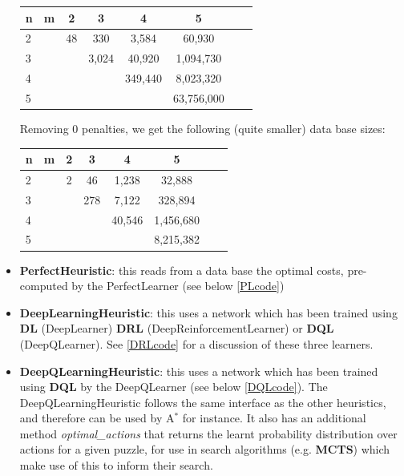 \begin{itemize}
\begin{center}
\begin{tabular}{l*{6}{c}r}
n              & m & 2 & 3 & 4 & 5\\
\hline
2              &   & 48 & 330 & 3,584 & 60,930 \\
3              &   &   & 3,024  & 40,920 &  1,094,730  \\
4              &   &   &  & 349,440 & 8,023,320   \\
5              &   &   &  &  & 63,756,000   \\
\end{tabular}
\end{center}
Removing 0 penalties, we get the following (quite smaller) data base sizes:
\begin{center}
\begin{tabular}{l*{6}{c}r}
n              & m & 2 & 3 & 4 & 5\\
\hline
2              &   & 2 & 46 & 1,238  & 32,888 \\
3              &   &  & 278  & 7,122 & 328,894   \\
4              &   &   &  & 40,546 &  1,456,680 \\
5              &   &   &  &  &  8,215,382 \\
\end{tabular}
\end{center}



\item \textbf{PerfectHeuristic}: this reads from a data base the optimal costs, pre-computed by the PerfectLearner (see below \ref{PLcode})
\item \textbf{DeepLearningHeuristic}: this uses a network which has been trained using \textbf{DL} (DeepLearner) \textbf{DRL} (DeepReinforcementLearner) or \textbf{DQL} (DeepQLearner). See \ref{DRLcode} for a discussion of these three learners.
\item \textbf{DeepQLearningHeuristic}: this uses a network which has been trained using \textbf{DQL} by the DeepQLearner (see below \ref{DQLcode}). The DeepQLearningHeuristic follows the same interface as the other heuristics, and therefore can be used by A$^{*}$ for instance. It also has an additional method \textit{optimal\_actions} that returns the learnt probability distribution over actions for a given puzzle, for use in search algorithms (e.g. \textbf{MCTS}) which make use of this to inform their search.
\end{itemize}



